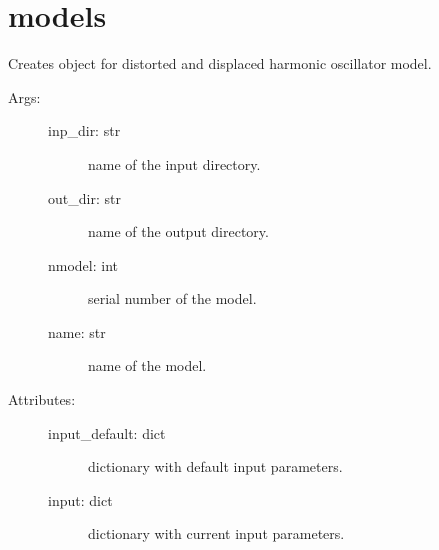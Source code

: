 \documentclass[letterpaper,10pt,english]{sphinxmanual}
\begin{document}
\section{models}
\label{\detokenize{modules/model:module-phlab.model}}\label{\detokenize{modules/model:models}}\label{\detokenize{modules/model::doc}}

\begin{fulllineitems}
\label{\detokenize{modules/model:phlab.model.dist_disp_osc}}
Creates object for distorted and displaced harmonic oscillator model.
\begin{description}
\item[{Args:}] \leavevmode\begin{description}
\item[{inp\_dir: str}] \leavevmode
name of the input directory.

\item[{out\_dir: str}] \leavevmode
name of the output directory.

\item[{nmodel: int}] \leavevmode
serial number of the model.

\item[{name: str}] \leavevmode
name of the model.

\end{description}

\item[{Attributes:}] \leavevmode\begin{description}
\item[{input\_default: dict}] \leavevmode
dictionary with default input parameters.

\item[{input: dict}] \leavevmode
dictionary with current input parameters.


\end{description}
\end{description}
\end{fulllineitems}
\end{document}
